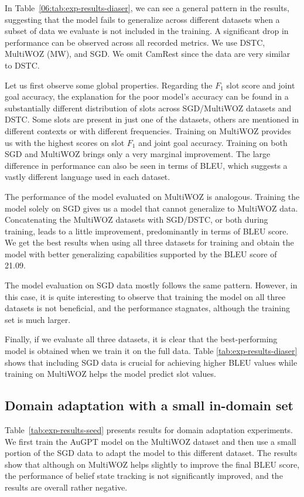 
In Table~\ref{06:tab:exp-results-diaser}, we can see a general pattern in the results, suggesting that the model fails to generalize across different datasets when a subset of data we evaluate is not included in the training. A significant drop in performance can be observed across all recorded metrics.
We use  DSTC, MultiWOZ (MW), and SGD. We omit CamRest since the data are very similar to DSTC.

Let us first observe some global properties.
Regarding the $F_1$ slot score and joint goal accuracy, the explanation for the poor model's accuracy can be found in a substantially different distribution of slots across SGD/MultiWOZ datasets and DSTC.
Some slots are present in just one of the datasets, others are mentioned in different contexts or with different frequencies.
Training on MultiWOZ provides us with the highest scores on slot $F_1$ and joint goal accuracy.
Training on both SGD and MultiWOZ brings only a very marginal improvement.
The large difference in performance can also be seen in terms of BLEU, which suggests a vastly different language used in each dataset.

The performance of the model evaluated on MultiWOZ is analogous.
Training the model solely on SGD gives us a model that cannot generalize to MultiWOZ data.
Concatenating the MultiWOZ datasets with SGD/DSTC, or both during training, leads to a little improvement, predominantly in terms of BLEU score.
We get the best results when using all three datasets for training and obtain the model with better generalizing capabilities supported by the BLEU score of 21.09.

The model evaluation on SGD data mostly follows the same pattern. However, in this case, it is quite interesting to observe that training the model on all three datasets is not beneficial, and the performance stagnates, although the training set is much larger.

Finally, if we evaluate all three datasets, it is clear that the best-performing model is obtained when we train it on the full data.
Table \ref{tab:exp-results-diaser} shows that including SGD data is crucial for achieving higher BLEU values while training on MultiWOZ helps the model predict slot values.

\subsection{Domain adaptation with a small in-domain set}
\label{06:seed}
Table~\ref{tab:exp-results-seed} presents results for domain adaptation experiments.
We first train the AuGPT model on the MultiWOZ dataset and then use a small portion of the SGD data to adapt the model to this different dataset.
The results show that although on MultiWOZ helps slightly to improve the final BLEU score, the performance of belief state tracking is not significantly improved, and the results are overall rather negative.

